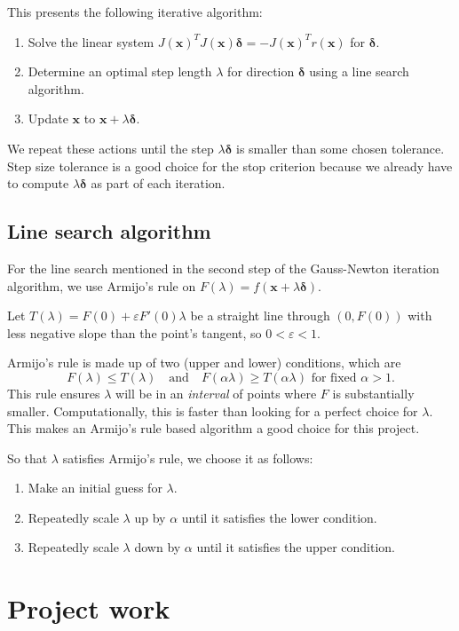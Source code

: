 \documentclass[12pt, a4paper]{article}
\newcommand{\bx}{{\boldsymbol{x}}}
\newcommand{\bd}{{\boldsymbol{\delta}}}
\begin{document}
This presents the following iterative algorithm:
\begin{enumerate}
    \item Solve the linear system ${J(\bx)}^T J(\bx)\bd=-{J(\bx)}^T r(\bx)$ for $\bd$.
    \item Determine an optimal step length $\lambda$ for direction $\bd$ using a line search algorithm.
    \item Update $\bx$ to $\bx+\lambda\bd$.
\end{enumerate}
We repeat these actions until the step $\lambda\bd$ is smaller than some chosen tolerance. Step size tolerance is a good choice for the stop criterion because we already have to compute $\lambda\bd$ as part of each iteration.

\subsection{Line search algorithm}

For the line search mentioned in the second step of the Gauss-Newton iteration algorithm, we use Armijo's rule on $F(\lambda)=f(\bx+\lambda\bd)$.

Let $T(\lambda)=F(0)+\varepsilon F'(0)\lambda$ be a straight line through $(0,F(0))$ with less negative slope than the point's tangent, so $0<\varepsilon<1$.

Armijo's rule is made up of two (upper and lower) conditions, which are\[F(\lambda)\le T(\lambda)\quad\text{and}\quad F(\alpha\lambda)\ge T(\alpha\lambda)\text{ for fixed }\alpha>1.\]
This rule ensures $\lambda$ will be in an \textit{interval} of points where $F $ is substantially smaller. Computationally, this is faster than looking for a perfect choice for $\lambda$. This makes an Armijo's rule based algorithm a good choice for this project.

So that $\lambda$ satisfies Armijo's rule, we choose it as follows:\begin{enumerate}
    \item Make an initial guess for $\lambda$.
    \item Repeatedly scale $\lambda$ up by $\alpha$ until it satisfies the lower condition.
    \item Repeatedly scale $\lambda$ down by $\alpha$ until it satisfies the upper condition. 
\end{enumerate}

\section{Project work}
\end{document}
